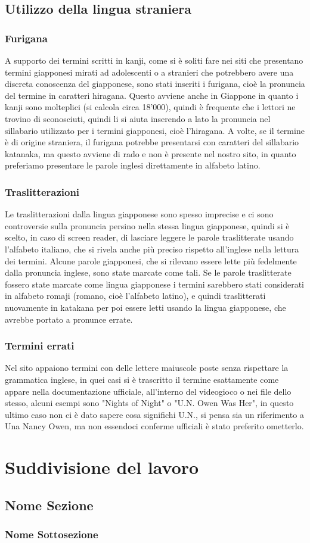 \documentclass[openany, a4paper, 12pt]{report}
\begin{document}
		\section{Utilizzo della lingua straniera}
			\subsection{Furigana}
				A supporto dei termini scritti in kanji, come si è soliti fare nei siti che presentano termini giapponesi mirati ad adolescenti o a stranieri che potrebbero avere una discreta conoscenza del giapponese, sono stati inseriti i furigana, cioè la pronuncia del termine in caratteri hiragana.
				Questo avviene anche in Giappone in quanto i kanji sono molteplici (si calcola circa 18'000), quindi è frequente che i lettori ne trovino di sconosciuti, quindi li si aiuta inserendo a lato la pronuncia nel sillabario utilizzato per i termini giapponesi, cioè l'hiragana.
				A volte, se il termine è di origine straniera, il furigana potrebbe presentarsi con caratteri del sillabario katanaka, ma questo avviene di rado e non è presente nel nostro sito, in quanto preferiamo presentare le parole inglesi direttamente in alfabeto latino. 
			\subsection{Traslitterazioni}
				Le traslitterazioni dalla lingua giapponese sono spesso imprecise e ci sono controversie sulla pronuncia persino nella stessa lingua giapponese, quindi si è scelto, in caso di screen reader, di lasciare leggere le parole traslitterate usando l'alfabeto italiano, che si rivela anche più preciso rispetto all'inglese nella lettura dei termini.
				Alcune parole giapponesi, che si rilevano essere lette più fedelmente dalla pronuncia inglese, sono state marcate come tali.
				Se le parole traslitterate fossero state marcate come lingua giapponese i termini sarebbero stati considerati in alfabeto romaji (romano, cioè l'alfabeto latino), e quindi traslitterati nuovamente in katakana per poi essere letti usando la lingua giapponese, che avrebbe portato a pronunce errate.
			\subsection{Termini errati}
				Nel sito appaiono termini con delle lettere maiuscole poste senza rispettare la grammatica inglese, in quei casi si è trascritto il termine esattamente come appare nella documentazione ufficiale, all'interno del videogioco o nei file dello stesso, alcuni esempi sono "Nights of Night" o "U.N. Owen Was Her", in questo ultimo caso non ci è dato sapere cosa significhi U.N., si pensa sia un riferimento a Una Nancy Owen, ma non essendoci conferme ufficiali è stato preferito ometterlo.\\
			
	\chapter{Suddivisione del lavoro}
	\section{Nome Sezione}
	\subsection{Nome Sottosezione}
\end{document}
